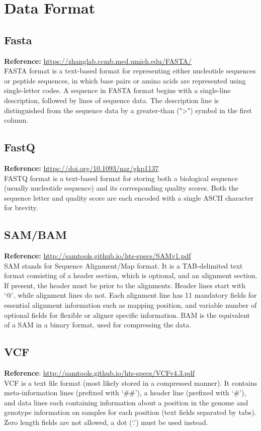 \documentclass[8pt]{article}
\begin{document}
	







\section*{Data Format}
\subsection*{Fasta}
\textbf{Reference:} \url{https://zhanglab.ccmb.med.umich.edu/FASTA/}\\ 
FASTA format is a text-based format for representing either nucleotide sequences or peptide sequences, in which base pairs or amino acids are represented using single-letter codes. A sequence in FASTA format begins with a single-line description, followed by lines of sequence data. The description line is distinguished from the sequence data by a greater-than (">") symbol in the first column. 
\subsection*{FastQ}
\textbf{Reference:} \url{https://doi.org/10.1093/nar/gkp1137}\\ 
FASTQ format is a text-based format for storing both a biological sequence (usually nucleotide sequence) and its corresponding quality scores. Both the sequence letter and quality score are each encoded with a single ASCII character for brevity. 
\subsection*{SAM/BAM}
\textbf{Reference:} \url{http://samtools.github.io/hts-specs/SAMv1.pdf}\\ 
SAM stands for Sequence Alignment/Map format.  It is a TAB-delimited text format consisting of a header section, which is optional, and an alignment section.  If present, the header must be prior to the alignments. Header lines start with ‘@’, while alignment lines do not.  Each alignment line has 11 mandatory fields for essential alignment information such as mapping position, and variable number of optional fields for flexible or aligner specific information. BAM is the equivalent of a SAM in a binary format, used for compressing the data.
\subsection*{VCF}
\textbf{Reference}: \url{http://samtools.github.io/hts-specs/VCFv4.3.pdf}\\
VCF is a text file format (most likely stored in a compressed manner).  It contains meta-information lines (prefixed with ‘\#\#’), a header line (prefixed with ‘\#’), and data lines each containing information about a position in the genome and genotype information on samples for each position (text fields separated by tabs).  Zero length fields are not allowed, a dot (‘.’) must be used instead.
\end{document}
